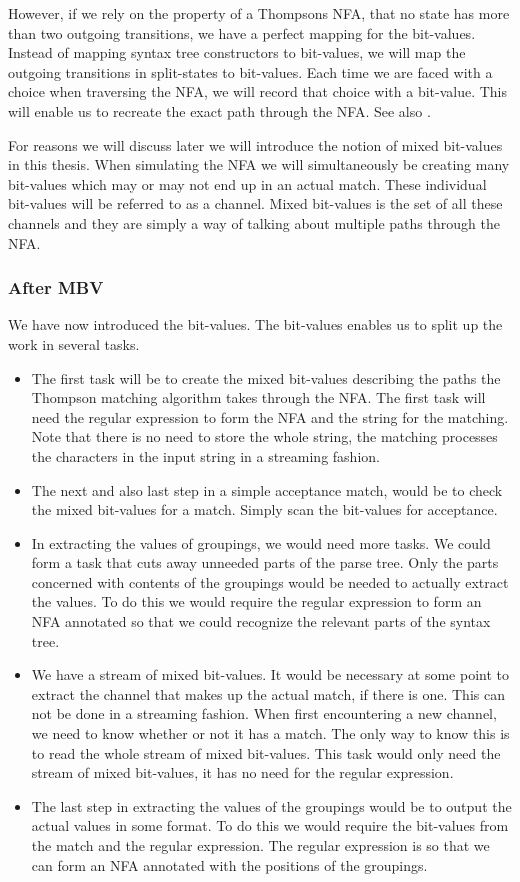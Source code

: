 However, if we rely on the property of a Thompsons NFA, that no state has more than two outgoing transitions, we have
a perfect mapping for the bit-values. Instead of mapping syntax tree
constructors to bit-values, we will map the outgoing transitions in
split-states to bit-values. Each time we are faced with a choice when
traversing the NFA, we will record that choice with a bit-value. This
will enable us to recreate the exact path through the NFA. See also
\cite{Dube2000}.

For reasons we will discuss later we will introduce the notion of
mixed bit-values in this thesis. When simulating the NFA we will
simultaneously be creating many bit-values which may or may not end up
in an actual match. These individual bit-values will be referred to as a
channel. Mixed bit-values is the set of all these channels and they are simply a
way of talking about multiple paths through the NFA.

\subsubsection{After MBV}
We have now introduced the bit-values. The bit-values enables us to
split up the work in several tasks. 
\begin{itemize}
\item The first task will be to create the mixed bit-values describing
  the paths the Thompson matching algorithm takes through the NFA. The
  first task will need the regular expression to form the NFA and the
  string for the matching. Note that there is no need to store the
  whole string, the matching processes the characters in the input
  string in a streaming fashion.
\item The next and also last step in a simple acceptance match, would
  be to check the mixed bit-values for a match. Simply scan the
  bit-values for acceptance. 
\item In extracting the values of groupings, we would need more
  tasks. We could form a task that cuts away unneeded parts of the
  parse tree. Only the parts concerned with contents of the groupings
  would be needed to actually extract the values. To do this we would
  require the regular expression to form an NFA annotated so that we
  could recognize the relevant parts of the syntax tree.
\item We have a stream of mixed bit-values. It would be necessary at
  some point to extract the channel that makes up the actual match, if
  there is one. This can not be done in a streaming fashion. When
  first encountering a new channel, we need to know whether or not it
  has a match. The only way to know this is to read the whole stream
  of mixed bit-values. This task would only need the stream of mixed
  bit-values, it has no need for the regular expression.
\item The last step in extracting the values of the groupings would be
  to output the actual values in some format. To do this we would
  require the bit-values from the match and the regular
  expression. The regular expression is so that we can form an NFA
  annotated with the positions of the groupings. 
\end{itemize}


